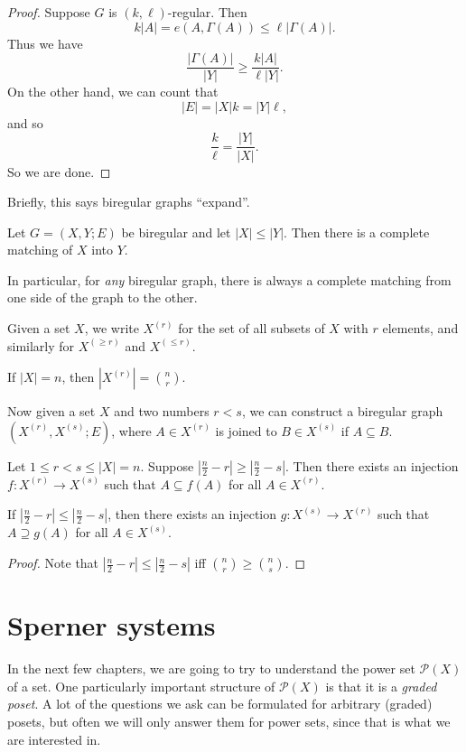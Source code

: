 \documentclass[a4paper]{article}
\begin{document}
\begin{proof}
  Suppose $G$ is $(k, \ell)$-regular. Then
  \[
    k|A| = e(A, \Gamma(A)) \leq \ell |\Gamma(A)|.
  \]
  Thus we have
  \[
    \frac{|\Gamma(A)|}{|Y|} \geq \frac{k|A|}{\ell |Y|}.%
  \]
  On the other hand, we can count that
  \[
    |E| = |X| k = |Y| \ell,
  \]
  and so
  \[
    \frac{k}{\ell} = \frac{|Y|}{|X|}.
  \]
  So we are done.
\end{proof}
Briefly, this says biregular graphs ``expand''.

\begin{cor}
  Let $G = (X, Y; E)$ be biregular and let $|X| \leq |Y|$. Then there is a complete matching of $X$ into $Y$.
\end{cor}
In particular, for \emph{any} biregular graph, there is always a complete matching from one side of the graph to the other.

\begin{notation}
  Given a set $X$, we write $X^{(r)}$ for the set of all subsets of $X$ with $r$ elements, and similarly for $X^{(\geq r)}$ and $X^{(\leq r)}$.
\end{notation}

If $|X| = n$, then $|X^{(r)}| = \binom{n}{r}$.

Now given a set $X$ and two numbers $r < s$, we can construct a biregular graph $(X^{(r)}, X^{(s)}; E)$, where $A \in X^{(r)}$ is joined to $B \in X^{(s)}$ if $A \subseteq B$.

\begin{cor}
  Let $1 \leq r < s \leq |X| = n$. Suppose $|\frac{n}{2} -r | \geq |\frac{n}{2} - s|$. Then there exists an injection $f: X^{(r)} \to X^{(s)}$ such that $A \subseteq f(A)$ for all $A \in X^{(r)}$.

  If $|\frac{n}{2} - r| \leq |\frac{n}{2} - s|$, then there exists an injection $g: X^{(s)} \to X^{(r)}$ such that $A \supseteq g(A)$ for all $A \in X^{(s)}$.
\end{cor}

\begin{proof}
  Note that $|\frac{n}{2} - r| \leq |\frac{n}{2} - s|$ iff $\binom{n}{r} \geq \binom{n}{s}$.
\end{proof}

\section{Sperner systems}
In the next few chapters, we are going to try to understand the power set $\mathcal{P}(X)$ of a set. One particularly important structure of $\mathcal{P}(X)$ is that it is a \emph{graded poset}. A lot of the questions we ask can be formulated for arbitrary (graded) posets, but often we will only answer them for power sets, since that is what we are interested in.
\end{document}
